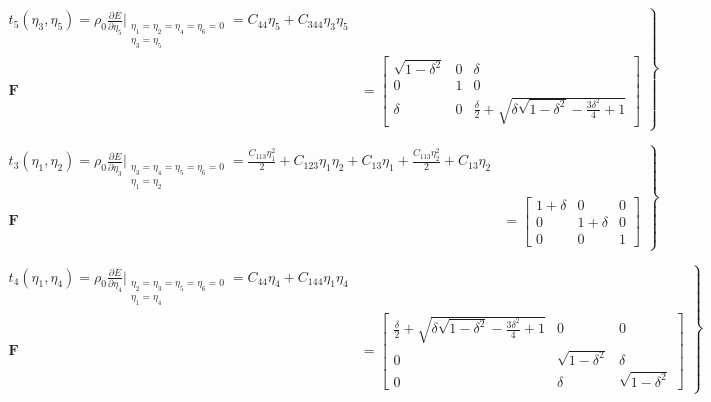 \documentclass[showpacs,aps,floatfix,prb,reprint,superscriptaddress,onecolumn]{revtex4-1}
\begin{document}


\begin{equation}
\label{eqn:SM-s9}
  \left.\begin{aligned}
        t_{5} \left(\eta_{3}, \eta_{5}\right) = \rho_{0} \frac{\partial E}{\partial \eta_{5}}\Bigr|_{\substack{\eta_1=\eta_2=\eta_4=\eta_6=0 \\ \eta_3=\eta_5}} = C_{44}\eta_{5} + C_{344}\eta_{3}\eta_{5}\\
        \bm{F}&=\begin{bmatrix} \sqrt{1-\delta^2} & 0 & \delta \\ 0 & 1 & 0 \\ \delta & 0 & \frac{\delta}{2} + \sqrt{\delta \sqrt{1-\delta^2}- \frac{3 \delta^{2}}{4} + 1} \end{bmatrix}
       \end{aligned}
			\right\}
\end{equation}


\begin{equation}
\label{eqn:SM-s10}
  \left.\begin{aligned}
        t_{3} \left(\eta_{1}, \eta_{2}\right) = \rho_{0} \frac{\partial E}{\partial \eta_{3}}\Bigr|_{\substack{\eta_3=\eta_4=\eta_5=\eta_6=0 \\ \eta_1 = \eta_2}} = \frac{C_{113}\eta_{1}^2}{2} + C_{123}\eta_{1}\eta_{2} + C_{13}\eta_{1} +  \frac{C_{113}\eta_{2}^2}{2} + C_{13}\eta_{2}\\
        \bm{F}&=\begin{bmatrix} 1+\delta & 0 & 0 \\ 0 & 1+\delta & 0 \\ 0 & 0 & 1 \end{bmatrix}
       \end{aligned}
			\right\}
\end{equation}


\begin{equation}
\label{eqn:SM-s11}
  \left.\begin{aligned}
        t_{4} \left(\eta_{1}, \eta_{4}\right) = \rho_{0} \frac{\partial E}{\partial \eta_{4}}\Bigr|_{\substack{\eta_2=\eta_3=\eta_5=\eta_6=0 \\ \eta_{1}=\eta_{4}}} = C_{44}\eta_{4} + C_{144}\eta_{1}\eta_{4}\\
        \bm{F}&=\begin{bmatrix} \frac{\delta}{2}+\sqrt{\delta \sqrt{1-\delta^2}-\frac{3 \delta^2}{4}+1} & 0 & 0 \\ 0 & \sqrt{1-\delta^2} & \delta \\ 0 & \delta & \sqrt{1-\delta^2} \end{bmatrix}
       \end{aligned}
			\right\}
\end{equation}
\end{document}

